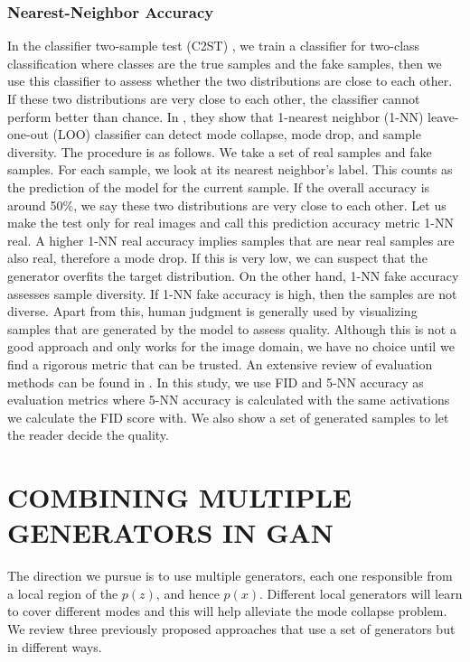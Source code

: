\documentclass[a4paper,onesided,12pt]{report}
\begin{document}
\subsection{Nearest-Neighbor Accuracy}
\label{subsec:nn}
In the classifier two-sample test (C2ST) \cite{lopez2016revisiting}, we train a classifier for two-class classification where classes are the true samples and the fake samples, then we use this classifier to assess whether the two distributions are close to each other. If these two distributions are very close to each other, the classifier cannot perform better than chance. In \cite{xu2018empirical}, they show that 1-nearest neighbor (1-NN) leave-one-out (LOO) classifier can detect mode collapse, mode drop, and sample diversity. The procedure is as follows. We take a set of real samples and fake samples. For each sample, we look at its nearest neighbor's label. This counts as the prediction of the model for the current sample. If the overall accuracy is around 50\%, we say these two distributions are very close to each other. Let us make the test only for real images and call this prediction accuracy metric 1-NN real. A higher 1-NN real accuracy implies samples that are near real samples are also real, therefore a mode drop. If this is very low, we can suspect that the generator overfits the target distribution. On the other hand, 1-NN fake accuracy assesses sample diversity. If 1-NN fake accuracy is high, then the samples are not diverse. 
Apart from this, human judgment is generally used by visualizing samples that are generated by the model to assess quality. Although this is not a good approach and only works for the image domain, we have no choice until we find a rigorous metric that can be trusted. An extensive review of evaluation methods can be found in \cite{borji2019pros}. In this study, we use FID and 5-NN accuracy as evaluation metrics where 5-NN accuracy is calculated with the same activations we calculate the FID score with. We also show a set of generated samples to let the reader decide the quality.


\chapter{COMBINING MULTIPLE GENERATORS IN GAN}
\label{chapter:multiple_gan}

The direction we pursue is to use multiple generators, each one responsible from a local region of the $p(z)$, and hence $p(x)$. Different local generators will learn to cover different modes and this will help alleviate the mode collapse problem. We review three previously proposed approaches that use a set of generators but in different ways.
\end{document}
